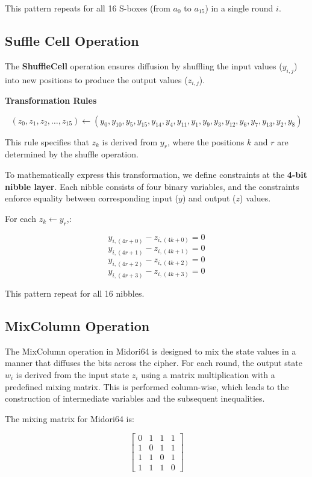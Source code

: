This pattern repeats for all 16 S-boxes (from \( a_0 \) to \( a_{15} \)) in a
single round \( i \).


\subsection{Suffle Cell Operation}

The \textbf{ShuffleCell} operation ensures diffusion by shuffling the input values (\( y_{i,j} \)) into
new positions to produce the output values (\( z_{i,j} \)).

\textbf{Transformation Rules}

\[
    (z_0, z_1, z_2, \ldots, z_{15}) \leftarrow (y_0, y_{10}, y_5, y_{15}, y_{14}, y_{4}, y_{11}, y_{1}, y_{9}, y_{3}, y_{12}, y_{6}, y_{7}, y_{13}, y_{2}, y_{8})
\]

This rule specifies that \( z_k \) is derived from \( y_r \), where the
positions \( k \) and \( r \) are determined by the shuffle operation.

To mathematically express this transformation, we define constraints at the
\textbf{4-bit nibble layer}. Each nibble consists of four binary variables, and
the constraints enforce equality between corresponding input (\( y \)) and
output (\( z \)) values.

For each \( z_k \leftarrow y_r \),:

\[
    y_{i,(4r+0)} - z_{i,(4k+0)} = 0
\]
\[
    y_{i,(4r+1)} - z_{i,(4k+1)} = 0
\]
\[
    y_{i,(4r+2)} - z_{i,(4k+2)} = 0
\]
\[
    y_{i,(4r+3)} - z_{i,(4k+3)} = 0
\]

This pattern repeat for all 16 nibbles.

\subsection{MixColumn Operation}

The MixColumn operation in Midori64 is designed to mix the state values in a
manner that diffuses the bits across the cipher. For each round, the output
state \(w_i\) is derived from the input state \(z_i\) using a matrix
multiplication with a predefined mixing matrix. This is performed column-wise,
which leads to the construction of intermediate variables and the subsequent
inequalities.

The mixing matrix for Midori64 is:

\[
    \begin{bmatrix}
        0 & 1 & 1 & 1 \\
        1 & 0 & 1 & 1 \\
        1 & 1 & 0 & 1 \\
        1 & 1 & 1 & 0
    \end{bmatrix}
\]

